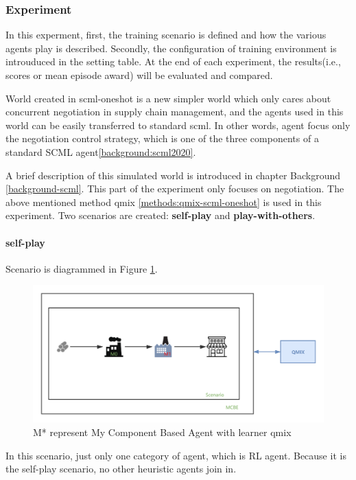 \subsubsection{Experiment}
In this experment, first, the training scenario is defined and how the various agents play is described. Secondly, the configuration of training environment is introuduced in the setting table. At the end of each experiment, the results(i.e., scores or mean episode award) will be evaluated and compared.

World created in scml-oneshot is a new simpler world which only cares about concurrent negotiation in supply chain management, and the agents used in this world can be easily transferred to standard scml. In other words, agent focus only the negotiation control strategy, which is one of the three components of a standard SCML agent\ref{background:scml2020}.
 
A brief description of this simulated world is introduced in chapter Background \ref{background-scml}. This part of the experiment only focuses on negotiation. The above mentioned method qmix \ref{methods:qmix-scml-oneshot} is used in this experiment. Two scenarios are created: \textbf{self-play} and \textbf{play-with-others}.

\paragraph{self-play}
Scenario is diagrammed in Figure \ref{fig:scenario-oneshot-scml-self-play}.
\begin{figure}[htbp]
\centering
\includegraphics[width=1.0\textwidth]{./images/scenario-oneshot-scml-self-play.png}
\caption{M* represent My Component Based Agent with learner \gls{qmix}}
\label{fig:scenario-oneshot-scml-self-play}
\end{figure}

In this scenario, just only one category of agent, which is RL agent. Because it is the self-play scenario, no other heuristic agents join in.
